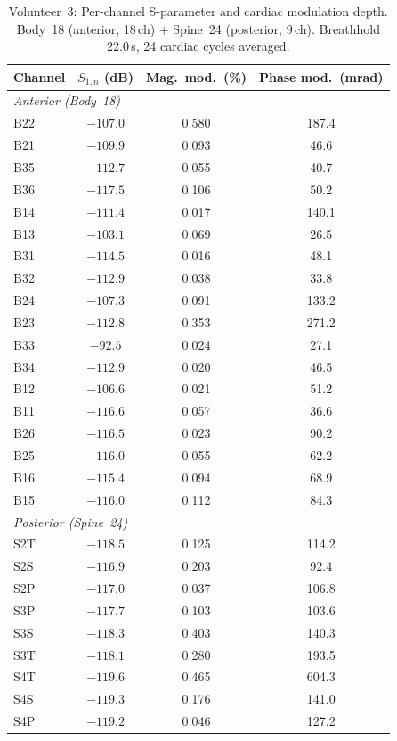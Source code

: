 \begin{table}[htbp]
\centering
\caption{Volunteer~3: Per-channel S-parameter and cardiac modulation depth. Body~18 (anterior, 18\,ch) + Spine~24 (posterior, 9\,ch). Breathhold 22.0\,s, 24 cardiac cycles averaged.}
\label{tab:exp-v3}
\small
\begin{tabular}{lccc}
\hline
Channel & $S_{1,n}$ (dB) & Mag.\ mod.\ (\%) & Phase mod.\ (mrad) \\
\hline
\multicolumn{4}{l}{\textit{Anterior (Body~18)}} \\
\hline
B22 & $-107.0$ & 0.580 & 187.4 \\
B21 & $-109.9$ & 0.093 & 46.6 \\
B35 & $-112.7$ & 0.055 & 40.7 \\
B36 & $-117.5$ & 0.106 & 50.2 \\
B14 & $-111.4$ & 0.017 & 140.1 \\
B13 & $-103.1$ & 0.069 & 26.5 \\
B31 & $-114.5$ & 0.016 & 48.1 \\
B32 & $-112.9$ & 0.038 & 33.8 \\
B24 & $-107.3$ & 0.091 & 133.2 \\
B23 & $-112.8$ & 0.353 & 271.2 \\
B33 & $-92.5$ & 0.024 & 27.1 \\
B34 & $-112.9$ & 0.020 & 46.5 \\
B12 & $-106.6$ & 0.021 & 51.2 \\
B11 & $-116.6$ & 0.057 & 36.6 \\
B26 & $-116.5$ & 0.023 & 90.2 \\
B25 & $-116.0$ & 0.055 & 62.2 \\
B16 & $-115.4$ & 0.094 & 68.9 \\
B15 & $-116.0$ & 0.112 & 84.3 \\
\hline
\multicolumn{4}{l}{\textit{Posterior (Spine~24)}} \\
\hline
S2T & $-118.5$ & 0.125 & 114.2 \\
S2S & $-116.9$ & 0.203 & 92.4 \\
S2P & $-117.0$ & 0.037 & 106.8 \\
S3P & $-117.7$ & 0.103 & 103.6 \\
S3S & $-118.3$ & 0.403 & 140.3 \\
S3T & $-118.1$ & 0.280 & 193.5 \\
S4T & $-119.6$ & 0.465 & 604.3 \\
S4S & $-119.3$ & 0.176 & 141.0 \\
S4P & $-119.2$ & 0.046 & 127.2 \\
\hline
\end{tabular}
\end{table}
